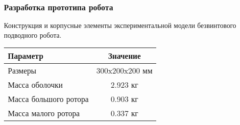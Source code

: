 \begin{frame}
\frametitle{Разработка прототипа робота}

Конструкция и корпусные элементы экспериментальной модели безвинтового подводного робота.

\begin{minipage}[ht]{0.33\linewidth}
	\vspace{-20mm}
	\vspace{3mm}
\end{minipage}
\hfill
\begin{minipage}[t]{0.63\linewidth}
	
	\begin{table}
		\centering
		{\begin{tabular}{@{}lc@{}}\hline
				Параметр & Значение \\
				\hline
				Размеры & 300x200x200 мм \\
				Масса оболочки  & 2.923 кг \\
				Масса большого ротора & 0.903 кг \\
				Масса малого ротора & 0.337 кг \\				
				\hline
			\end{tabular}
		}
	\end{table}
\end{minipage}

\end{frame}



